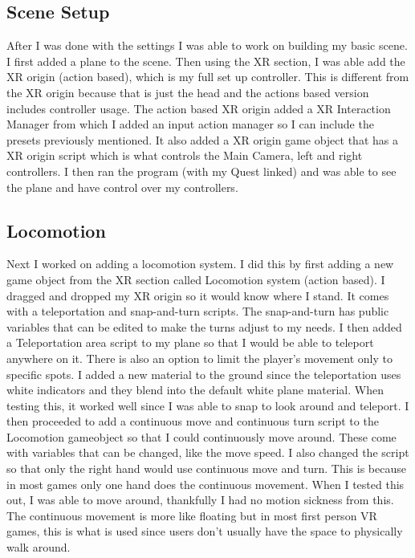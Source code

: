 \documentclass[11pt,twocolumn]{article}
\begin{document}
\subsection{Scene Setup}
After I was done with the settings I was able to work on building my basic scene. I first added a plane to the scene. Then using the XR section, I was able add the XR origin (action based), which is my full set up controller. This is different from the XR origin because that is just the head and the actions based version includes controller usage. The action based XR origin added a XR Interaction Manager from which I added an input action manager so I can include the presets previously mentioned. It also added a XR origin game object that has a XR origin script which is what controls the Main Camera, left and right controllers. I then ran the program (with my Quest linked) and was able to see the plane and have control over my controllers.


\subsection{Locomotion}
Next I worked on adding a locomotion system. I did this by first adding a new game object from the XR section called Locomotion system (action based). I dragged and dropped my XR origin so it would know where I stand. It comes with a teleportation and snap-and-turn scripts. The snap-and-turn has public variables that can be edited to make the turns adjust to my needs. I then added a Teleportation area script to my plane so that I would be able to teleport anywhere on it. There is also an option to limit the player’s movement only to specific spots. I added a new material to the ground since the teleportation uses white indicators and they blend into the default white plane material. When testing this, it worked well since I was able to snap to look around and teleport. I then proceeded to add a continuous move and continuous turn script to the Locomotion gameobject so that I could continuously move around. These come with variables that can be changed, like the move speed. I also changed the script so that only the right hand would use continuous move and turn. This is because in most games only one hand does the continuous movement. When I tested this out, I was able to move around, thankfully I had no motion sickness from this. The continuous movement is more like floating but in most first person VR games, this is what is used since users don’t usually have the space to physically walk around.
\end{document}
